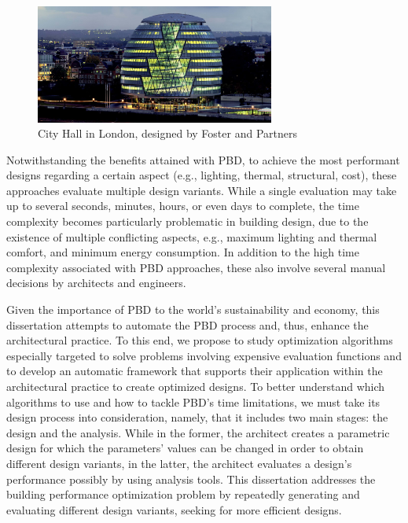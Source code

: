 	\begin{figure}[htbp]
		\centering
		\includegraphics[width=0.70\textwidth]{./Images/Introduction/cityhalllondon.jpg}
		\caption{City Hall in London, designed by Foster and Partners}
		\label{fig:cityhalllondon}
	\end{figure}

	Notwithstanding the benefits attained with \ac{PBD}, to achieve the most performant designs regarding a certain aspect (e.g., lighting, thermal, structural, cost), these approaches evaluate multiple design variants. While a single evaluation may take up to several seconds, minutes, hours, or even days to complete, the time complexity becomes particularly problematic in building design, due to the existence of multiple conflicting aspects, e.g., maximum lighting and thermal comfort, and minimum energy consumption. In addition to the high time complexity associated with \ac{PBD} approaches, these also involve several manual decisions by architects and engineers.
		
	Given the importance of \ac{PBD} to the world's sustainability and economy, this dissertation  attempts to automate the \ac{PBD} process and, thus, enhance the architectural practice. To this end, we propose to study optimization algorithms especially targeted to solve problems involving expensive evaluation functions and to develop an automatic framework that supports their application within the architectural practice to create optimized designs. To better understand which algorithms to use and how to tackle \ac{PBD}'s time limitations, we must take its design process into consideration, namely, that it includes two main stages: the design and the analysis. While in the former, the architect creates a parametric design for which the parameters' values can be changed in order to obtain different design variants, in the latter, the architect evaluates a design's performance possibly by using analysis tools. This dissertation addresses the building performance optimization problem by repeatedly generating and evaluating different design variants, seeking for more efficient designs.
	

